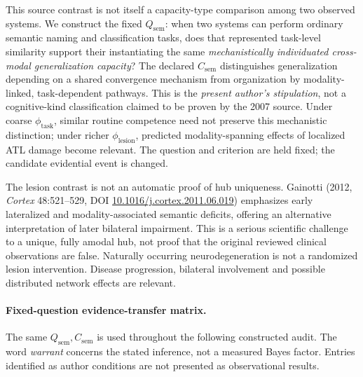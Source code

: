 \documentclass[11pt]{article}
\begin{document}
This source contrast is not itself a capacity-type comparison among two observed systems. We construct the fixed \(Q_{\mathrm{sem}}\): when two systems can perform ordinary semantic naming and classification tasks, does that represented task-level similarity support their instantiating the same \emph{mechanistically individuated cross-modal generalization capacity}? The declared \(C_{\mathrm{sem}}\) distinguishes generalization depending on a shared convergence mechanism from organization by modality-linked, task-dependent pathways. This is the \emph{present author's stipulation}, not a cognitive-kind classification claimed to be proven by the 2007 source. Under coarse \(\phi_{\mathrm{task}}\), similar routine competence need not preserve this mechanistic distinction; under richer \(\phi_{\mathrm{lesion}}\), predicted modality-spanning effects of localized ATL damage become relevant. The question and criterion are held fixed; the candidate evidential event is changed.

The lesion contrast is not an automatic proof of hub uniqueness. Gainotti (2012, \emph{Cortex} 48:521--529, DOI \href{https://doi.org/10.1016/j.cortex.2011.06.019}{10.1016/j.cortex.2011.06.019}) emphasizes early lateralized and modality-associated semantic deficits, offering an alternative interpretation of later bilateral impairment. This is a serious scientific challenge to a unique, fully amodal hub, not proof that the original reviewed clinical observations are false. Naturally occurring neurodegeneration is not a randomized lesion intervention. Disease progression, bilateral involvement and possible distributed network effects are relevant.


\paragraph{Fixed-question evidence-transfer matrix.}
The same \(Q_{\mathrm{sem}},C_{\mathrm{sem}}\) is used throughout the following constructed audit. The word \emph{warrant} concerns the stated inference, not a measured Bayes factor. Entries identified as author conditions are not presented as observational results.
\end{document}
